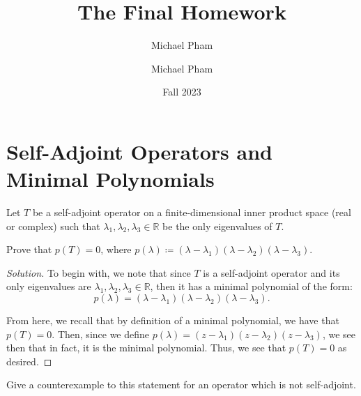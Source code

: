 \documentclass{article}
\title{#1}
\author{Michael Pham}
\date{#2}
\newenvironment{solution}{\begin{proof}[Solution]}{\end{proof}}
\newcommand{\RR}{\mathbb{R}}
\newcommand{\mytitle}[2]{%
	\title{#1}
	\author{Michael Pham}
	\date{#2}
	\maketitle
	\newpage
	\tableofcontents
	\newpage
}
\begin{document}
\mytitle{The Final Homework}{Fall 2023}
\section{Self-Adjoint Operators and Minimal Polynomials}
\begin{hw}
	Let $T$ be a self-adjoint operator on a finite-dimensional inner product space (real or complex) such that $\lambda_{1}, \lambda_{2}, \lambda_{3} \in \RR$ be the only eigenvalues of $T$. 
	
	Prove that $p(T) = 0$, where $p(\lambda) \coloneq (\lambda - \lambda_1)(\lambda - \lambda_{2})(\lambda - \lambda_3)$.
\end{hw}
\begin{solution}
	To begin with, we note that since $T$ is a self-adjoint operator and its only eigenvalues are $\lambda_1, \lambda_2, \lambda_3 \in \RR$, then it has a minimal polynomial of the form:
	\begin{equation*}
		p(\lambda) = (\lambda - \lambda_1)(\lambda - \lambda_2)(\lambda - \lambda_3).
	\end{equation*}

	From here, we recall that by definition of a minimal polynomial, we have that $p(T) = 0$. Then, since we define $p(\lambda) = (z- \lambda_1)(z-\lambda_2)(z-\lambda_3)$, we see then that in fact, it is the minimal polynomial. Thus, we see that $p(T) = 0$ as desired.
\end{solution}
\begin{hw}
	Give a counterexample to this statement for an operator which is not self-adjoint.
\end{hw}
\end{document}

